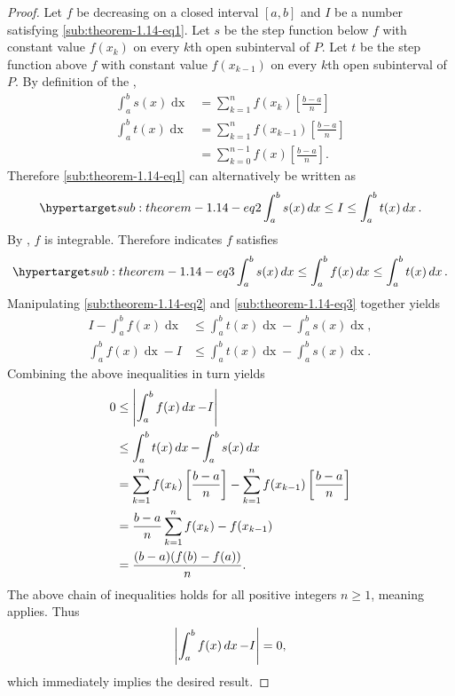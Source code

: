 \documentclass{report}
\begin{document}
  \begin{proof}
    Let $f$ be decreasing on a closed interval $[a, b]$ and $I$ be a number
      satisfying \eqref{sub:theorem-1.14-eq1}.
    Let $s$ be the step function below $f$ with constant value $f(x_k)$
      on every $k$th open subinterval of $P$.
    Let $t$ be the step function above $f$ with constant value $f(x_{k-1})$
      on every $k$th open subinterval of $P$.
    By definition of the ,
      \begin{align*}
        \int_a^b s(x) \mathop{dx}
          & = \sum_{k=1}^n f(x_k) \left[\frac{b - a}{n}\right] \\
        \int_a^b t(x) \mathop{dx}
          & = \sum_{k=1}^n f(x_{k-1}) \left[\frac{b - a}{n}\right] \\
          & = \sum_{k=0}^{n-1} f(x) \left[\frac{b - a}{n}\right].
      \end{align*}
    Therefore \eqref{sub:theorem-1.14-eq1} can alternatively be written as
      \begin{equation}
        \hyperlabel{sub:theorem-1.14-eq2}
        \int_a^b s(x) \mathop{dx} \leq I \leq \int_a^b t(x) \mathop{dx}.
      \end{equation}
    By , $f$ is integrable.
    Therefore  indicates $f$ satisfies
      \begin{equation}
        \hyperlabel{sub:theorem-1.14-eq3}
        \int_a^b s(x) \mathop{dx}
          \leq \int_a^b f(x) \mathop{dx}
          \leq \int_a^b t(x) \mathop{dx}.
      \end{equation}
    Manipulating \eqref{sub:theorem-1.14-eq2} and \eqref{sub:theorem-1.14-eq3}
      together yields
      \begin{align*}
        I - \int_a^b f(x) \mathop{dx}
          & \leq \int_a^b t(x) \mathop{dx} - \int_a^b s(x) \mathop{dx}, \\
        \int_a^b f(x) \mathop{dx} - I
          & \leq \int_a^b t(x) \mathop{dx} - \int_a^b s(x) \mathop{dx}.
      \end{align*}
    Combining the above inequalities in turn yields
      \begin{align*}
        0
          & \leq \left|\int_a^b f(x) \mathop{dx} - I\right| \\
          & \leq \int_a^b t(x) \mathop{dx} - \int_a^b s(x) \mathop{dx} \\
          & = \sum_{k=1}^n f(x_k) \left[ \frac{b - a}{n} \right] -
              \sum_{k=1}^n f(x_{k-1}) \left[ \frac{b - a}{n} \right] \\
          & = \frac{b - a}{n} \sum_{k=1}^n f(x_k) - f(x_{k-1}) \\
          & = \frac{(b - a)(f(b) - f(a))}{n}.
      \end{align*}
    The above chain of inequalities holds for all positive integers $n \geq 1$,
      meaning  applies.
    Thus $$\left|\int_a^b f(x) \mathop{dx} - I\right| = 0,$$ which immediately implies
      the desired result.
  \end{proof}
\end{document}
